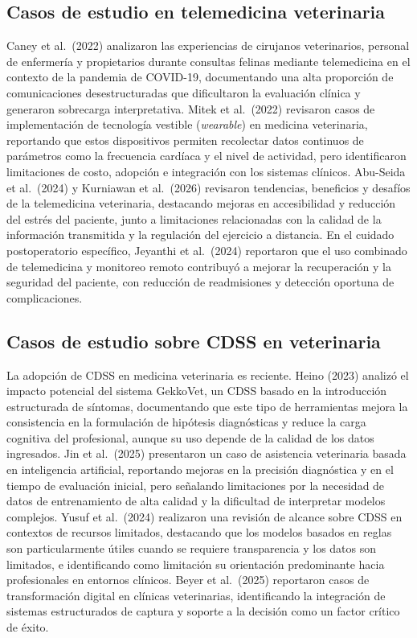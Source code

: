 \documentclass[stu, spanish]{apa7}
\begin{document}
\subsection{Casos de estudio en telemedicina veterinaria}
Caney et al.\ (2022) analizaron las experiencias de cirujanos veterinarios, personal de enfermer\'{i}a y propietarios durante consultas felinas mediante telemedicina en el contexto de la pandemia de COVID-19, documentando una alta proporci\'{o}n de comunicaciones desestructuradas que dificultaron la evaluaci\'{o}n cl\'{i}nica y generaron sobrecarga interpretativa. Mitek et al.\ (2022) revisaron casos de implementaci\'{o}n de tecnolog\'{i}a vestible (\textit{wearable}) en medicina veterinaria, reportando que estos dispositivos permiten recolectar datos continuos de par\'{a}metros como la frecuencia card\'{i}aca y el nivel de actividad, pero identificaron limitaciones de costo, adopci\'{o}n e integraci\'{o}n con los sistemas cl\'{i}nicos. Abu-Seida et al.\ (2024) y Kurniawan et al.\ (2026) revisaron tendencias, beneficios y desaf\'{i}os de la telemedicina veterinaria, destacando mejoras en accesibilidad y reducci\'{o}n del estr\'{e}s del paciente, junto a limitaciones relacionadas con la calidad de la informaci\'{o}n transmitida y la regulaci\'{o}n del ejercicio a distancia. En el cuidado postoperatorio espec\'{i}fico, Jeyanthi et al.\ (2024) reportaron que el uso combinado de telemedicina y monitoreo remoto contribuy\'{o} a mejorar la recuperaci\'{o}n y la seguridad del paciente, con reducci\'{o}n de readmisiones y detecci\'{o}n oportuna de complicaciones.

\subsection{Casos de estudio sobre CDSS en veterinaria}
La adopci\'{o}n de CDSS en medicina veterinaria es reciente. Heino (2023) analiz\'{o} el impacto potencial del sistema GekkoVet, un CDSS basado en la introducci\'{o}n estructurada de s\'{i}ntomas, documentando que este tipo de herramientas mejora la consistencia en la formulaci\'{o}n de hip\'{o}tesis diagn\'{o}sticas y reduce la carga cognitiva del profesional, aunque su uso depende de la calidad de los datos ingresados. Jin et al.\ (2025) presentaron un caso de asistencia veterinaria basada en inteligencia artificial, reportando mejoras en la precisi\'{o}n diagn\'{o}stica y en el tiempo de evaluaci\'{o}n inicial, pero se\~{n}alando limitaciones por la necesidad de datos de entrenamiento de alta calidad y la dificultad de interpretar modelos complejos. Yusuf et al.\ (2024) realizaron una revisi\'{o}n de alcance sobre CDSS en contextos de recursos limitados, destacando que los modelos basados en reglas son particularmente \'{u}tiles cuando se requiere transparencia y los datos son limitados, e identificando como limitaci\'{o}n su orientaci\'{o}n predominante hacia profesionales en entornos cl\'{i}nicos. Beyer et al.\ (2025) reportaron casos de transformaci\'{o}n digital en cl\'{i}nicas veterinarias, identificando la integraci\'{o}n de sistemas estructurados de captura y soporte a la decisi\'{o}n como un factor cr\'{i}tico de \'{e}xito.
\end{document}
